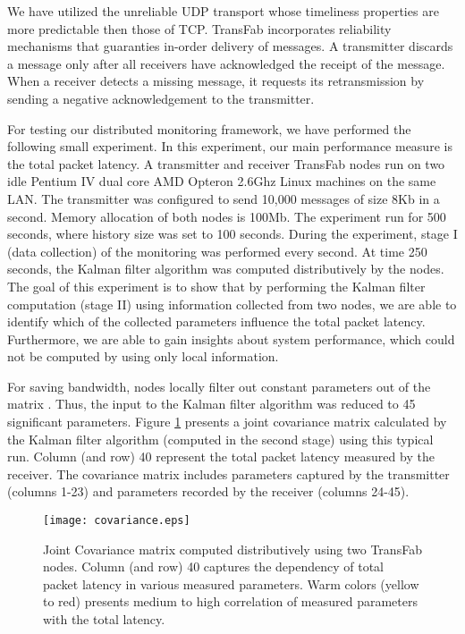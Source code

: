 \documentclass[times, 10pt,twocolumn]{article}
\begin{document}
We have utilized the unreliable UDP transport whose timeliness properties are more predictable then those of TCP. TransFab incorporates reliability mechanisms that guaranties in-order delivery of messages.
A transmitter discards a message only after all receivers have acknowledged the receipt of the message. When a receiver detects a missing message, it requests its retransmission by sending a negative acknowledgement to the transmitter.

For testing our distributed monitoring framework, we have performed the following small experiment.
In this experiment, our main performance measure is the total packet latency.
A transmitter and receiver TransFab nodes run on two idle Pentium IV dual core AMD Opteron 2.6Ghz Linux machines on the same LAN. The transmitter was configured to send 10,000 messages of size 8Kb in a second. Memory allocation of both nodes is 100Mb.
The experiment run for 500 seconds, where history size  was set to 100 seconds. During the experiment, stage I (data collection) of the monitoring was performed every  second. At time 250 seconds, the Kalman filter
algorithm was computed distributively by the nodes. The goal of this
experiment is to show that by performing the Kalman filter computation (stage II) using information collected
from two nodes, we are able to identify which of the collected parameters influence the total packet latency.
Furthermore, we are able to gain insights about system performance, which could not be computed by using only local
information.


For saving bandwidth, nodes locally filter out constant parameters out of the matrix . Thus, the input
to the Kalman filter algorithm was reduced to 45 significant parameters. Figure \ref{covariance2} presents a joint covariance matrix calculated by the Kalman filter algorithm (computed in the second stage) using this
typical run. Column (and row) 40 represent the total packet latency measured by the receiver. The covariance matrix includes parameters captured by the transmitter (columns 1-23) and parameters recorded by the receiver (columns 24-45).
\begin{figure}[ht!]
\hspace{-1cm}
\texttt{[image: covariance.eps]}\\
  \caption{Joint Covariance matrix computed distributively using two TransFab nodes. Column (and row) 40 captures the dependency of total packet latency in various measured parameters. Warm colors (yellow to red) presents medium to high correlation of measured parameters with the total latency.}\label{covariance2}
\end{figure}
\end{document}
